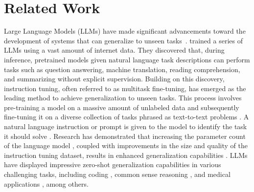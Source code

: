 \documentclass{article} \usepackage{iclr2024_conference,times}
\begin{document}
\section{Related Work}
Large Language Models (LLMs) have made significant advancements toward the development of systems that can generalize to unseen tasks~\citep{10.1145/3605943}. \citet{radford2019language} trained a series of LLMs using a vast amount of internet data. They discovered that, during inference, pretrained models given natural language task descriptions can perform tasks such as question answering, machine translation, reading comprehension, and summarizing without explicit supervision. Building on this discovery, instruction tuning, often referred to as multitask fine-tuning, has emerged as the leading method to achieve generalization to unseen tasks. This process involves pre-training a model on a massive amount of unlabeled data and subsequently fine-tuning it on a diverse collection of tasks \citep{DBLP:conf/emnlp/WangMAKMNADASPK22,DBLP:journals/corr/abs-2210-11416} phrased as text-to-text problems \citep{DBLP:journals/jmlr/RaffelSRLNMZLL20}. A natural language instruction or prompt is given to the model to identify the task it should solve \citep{DBLP:conf/eacl/SchickS21,DBLP:conf/naacl/ScaoR21}. Research has demonstrated that increasing the parameter count of the language model \citep{DBLP:conf/nips/BrownMRSKDNSSAA20}, coupled with improvements in the size and quality of the instruction tuning dataset, results in enhanced generalization capabilities \citep{DBLP:journals/corr/abs-2302-12692,DBLP:journals/corr/abs-2205-01068,DBLP:journals/corr/abs-2204-02311,DBLP:conf/acl/MuennighoffWSRB23,DBLP:journals/corr/abs-2302-13971,DBLP:journals/corr/abs-2307-09288}. LLMs have displayed impressive zero-shot generalization capabilities in various challenging tasks, including coding \cite{wang2021gpt,black-etal-2022-gpt,DBLP:journals/corr/abs-2308-12950}, common sense reasoning \cite{DBLP:journals/corr/abs-2302-13971}, and medical applications \cite{singhal2023large}, among others. 
\end{document}
